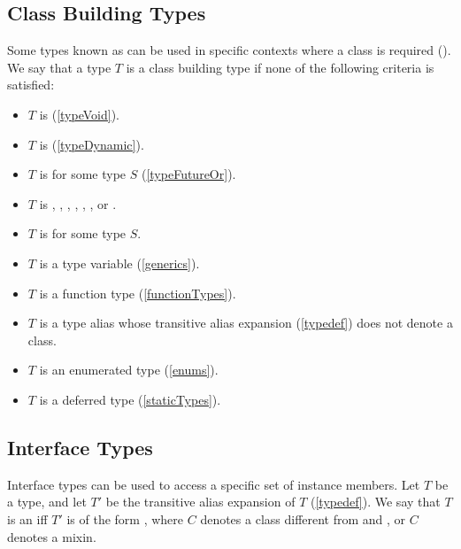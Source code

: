 \documentclass[makeidx]{article}
\begin{document}
\subsection{Class Building Types}

\LMHash{}%
Some types known as
can be used in specific contexts where a class is required
().
We say that a type $T$ is a class building type
if none of the following criteria is satisfied:

\begin{itemize}
\item $T$ is \VOID{} (\ref{typeVoid}).
\item $T$ is \DYNAMIC{} (\ref{typeDynamic}).
\item $T$ is  for some type $S$ (\ref{typeFutureOr}).
\item
  $T$ is , , , , ,
  , or .
\item $T$ is  for some type $S$.
\item $T$ is a type variable (\ref{generics}).
\item $T$ is a function type (\ref{functionTypes}).
\item $T$ is a type alias whose transitive alias expansion
  (\ref{typedef}) does not denote a class.
\item $T$ is an enumerated type (\ref{enums}).
\item $T$ is a deferred type (\ref{staticTypes}).
\end{itemize}


\subsection{Interface Types}

\LMHash{}%
Interface types can be used to access
a specific set of instance members.
Let $T$ be a type, and let $T'$ be the transitive alias expansion of $T$
(\ref{typedef}).
We say that $T$ is an  if{}f
$T'$ is of the form ,
where $C$ denotes a class different from  and ,
or $C$ denotes a mixin.

\end{document}
